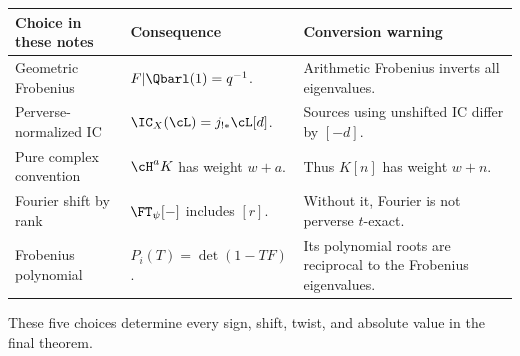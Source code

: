 \begin{longtable}{
 >{\raggedright\arraybackslash}p{}
 >{\raggedright\arraybackslash}p{}
 >{\raggedright\arraybackslash}p{}}
\toprule
Choice in these notes & Consequence & Conversion warning\\
\midrule
\endhead
Geometric Frobenius &
\(F|\Qbarl(1)=q^{-1}\). &
Arithmetic Frobenius inverts all eigenvalues.\\

Perverse-normalized IC &
\(\IC_X(\cL)=j_{!*}\cL[d]\). &
Sources using unshifted IC differ by \([-d]\).\\

Pure complex convention &
\(\cH^aK\) has weight \(w+a\). &
Thus \(K[n]\) has weight \(w+n\).\\

Fourier shift by rank &
\(\FT_\psi[-]\) includes \([r]\). &
Without it, Fourier is not perverse \(t\)-exact.\\

Frobenius polynomial &
\(P_i(T)=\det(1-TF)\). &
Its polynomial roots are reciprocal to the Frobenius eigenvalues.\\
\bottomrule
\end{longtable}

These five choices determine every sign, shift, twist, and absolute value in
the final theorem.
